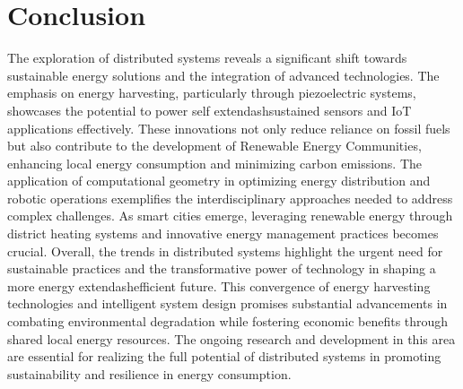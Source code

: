 \documentclass[runningheads]{llncs}
\begin{document}
\section{Conclusion}
The exploration of distributed systems reveals a significant shift towards sustainable energy solutions and the integration of advanced technologies. The emphasis on energy harvesting, particularly through piezoelectric systems, showcases the potential to power self	extendash{}sustained sensors and IoT applications effectively. These innovations not only reduce reliance on fossil fuels but also contribute to the development of Renewable Energy Communities, enhancing local energy consumption and minimizing carbon emissions. The application of computational geometry in optimizing energy distribution and robotic operations exemplifies the interdisciplinary approaches needed to address complex challenges. As smart cities emerge, leveraging renewable energy through district heating systems and innovative energy management practices becomes crucial. Overall, the trends in distributed systems highlight the urgent need for sustainable practices and the transformative power of technology in shaping a more energy	extendash{}efficient future. This convergence of energy harvesting technologies and intelligent system design promises substantial advancements in combating environmental degradation while fostering economic benefits through shared local energy resources. The ongoing research and development in this area are essential for realizing the full potential of distributed systems in promoting sustainability and resilience in energy consumption.
\end{document}
